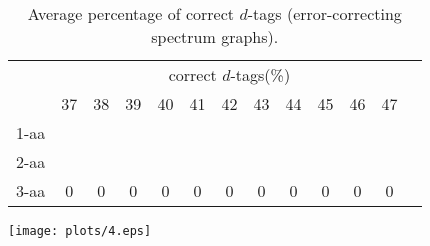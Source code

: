 \documentclass{article}
\begin{document}
\begin{table}[h]\tiny
\vspace{3mm}
{\centering
\begin{center}
\begin{tabular}{|l|c|c|c|c|c|c|c|c|c|c|c|c|}
  \hline
  & \multicolumn{ 11 }{|c|}{correct $d$-tags(\%)} \\
  \cline{2- 12}
    & 37 & 38 & 39 & 40 & 41 & 42 & 43 & 44 & 45 & 46 & 47\\
  \hline
1-aa  &  &  &  &  &  &  &  &  &  &  & \\
2-aa  &  &  &  &  &  &  &  &  &  &  & \\
3-aa  & 0 & 0 & 0 & 0 & 0 & 0 & 0 & 0 & 0 & 0 & 0\\
 \hline
\end{tabular}
\end{center}
\par}
\centering

\caption{ Average percentage of correct $d$-tags (error-correcting spectrum graphs).}

\vspace{3mm}
\label{table:correct-d-tags}
\end{table}
\texttt{[image: plots/4.eps]}
\end{document}
